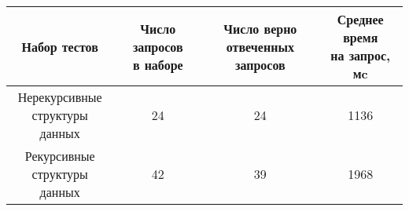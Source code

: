 \begin{table}
    \footnotesize
    \centering
    \begin{tabular}{ |c|c|c|c|  }
     \hline
     Набор тестов & \makecell{Число запросов \\в наборе} & \makecell{Число верно \\отвеченных запросов} & \makecell{Среднее время \\на запрос, мc} \\
     \hline
    \makecell{Нерекурсивные \\структуры данных} & 24 & 24 & 1136 \\
     \hline
    \makecell{Рекурсивные \\структуры данных} & 42 & 39 & 1968 \\
     \hline
    \end{tabular}
\end{table}

